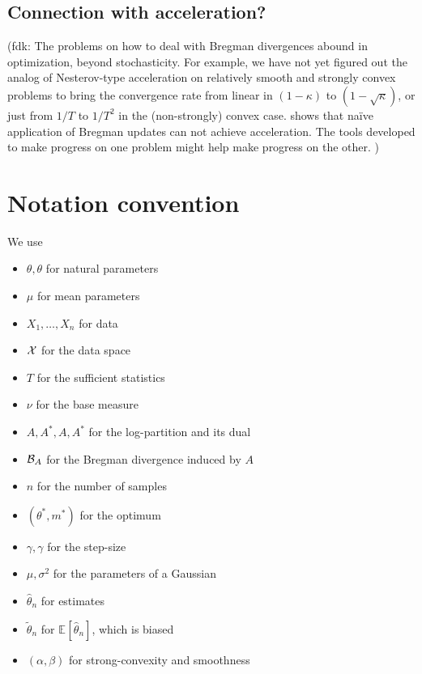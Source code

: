 \documentclass[twoside]{article}
\newcommand{\fdk}[1]{\textcolor{Periwinkle}{(fdk:#1)}}
\newcommand*{\expect}[2][]{\ensuremath{\mathbb{E}_{#1} \left[ #2 \right] }} %
\newcommand{\logpart}{A}
\newcommand{\conj}{{\logpart^*}}
\newcommand{\nat}{\theta}
\newcommand{\m}{\mu}
\newcommand{\lr}{\gamma} %
\newcommand{\stgcvx}{\alpha} %
\newcommand{\smooth}{\beta} %
\begin{document}
\subsection{Connection with acceleration?}
\fdk{
The problems on how to deal with Bregman divergences abound in optimization, beyond stochasticity.
For example, we have not yet figured out the analog of Nesterov-type acceleration
on relatively smooth and strongly convex problems
to bring the convergence rate from linear in $(1-\kappa)$ to $(1-\sqrt{\kappa})$,
or just from $1/T$ to $1/T^2$ in the (non-strongly) convex case.
\citet{dragomir2021optimal}  shows that naïve application of Bregman updates can not achieve acceleration.
The tools developed to make progress on one problem might help make progress on the other.
}






\newpage
\section{Notation convention}
We use
\begin{itemize}
	\item $\theta, \nat$ for natural parameters
	\item $\m$ for mean parameters
	\item $X_1,\ldots,X_n$ for data
	\item ${\mathcal X}$ for the data space
	\item $T$ for the sufficient statistics
	\item $\nu$ for the base measure
	\item $A, A^*, \logpart, \conj$ for the log-partition and its dual
	\item ${\mathcal B}_A$ for the Bregman divergence induced by $A$
	\item $n$ for the number of samples
	\item $(\theta^*,m^*)$ for the optimum
	\item $\gamma, \lr$ for the step-size
	\item $\mu,\sigma^2$ for the parameters of a Gaussian
	\item $\hat\theta_n$ for estimates
	\item $\tilde\theta_n$ for $\expect{\hat\theta_n}$, which is biased
	\item $(\stgcvx , \smooth)$ for strong-convexity and smoothness
\end{itemize}
\fi

 
\end{document}
